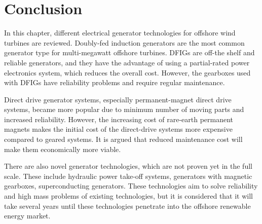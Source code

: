 \documentclass[a4paper, 11pt]{article} %
\begin{document}
\section{Conclusion}

In this chapter, different electrical generator technologies for offshore wind turbines are reviewed. Doubly-fed induction generators are the most common generator type for multi-megawatt offshore turbines. DFIGs are off-the shelf and reliable generators, and they have the advantage of using a partial-rated power electronics system, which reduces the overall cost. However, the gearboxes used with DFIGs have reliability problems and require regular maintenance. 

Direct drive generator systems, especially permanent-magnet direct drive systems, became more popular due to minimum number of moving parts and increased reliability. However, the increasing cost of rare-earth permanent magnets makes the initial cost of the direct-drive systems more expensive compared to geared systems. It is argued that reduced maintenance cost will make them economically more viable.

There are also novel generator technologies, which are not proven yet in the full scale. These include hydraulic power take-off systems, generators with magnetic gearboxes, superconducting generators. These technologies aim to solve reliability and high mass problems of existing technologies, but it is considered that it will take several years until these technologies penetrate into the offshore renewable energy market. 






\end{document}
